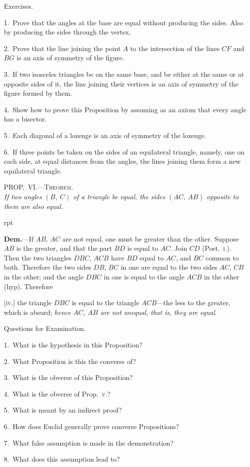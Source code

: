 \documentclass[oneside]{book}
\newcounter{wrapwidth}
\newcommand\myprop[2]{
\bigskip\Needspace*{4\baselineskip}\begin{center}\textsc{#1}\\\medskip\emph{#2}\par\end{center}
}
\newcommand\exhead[1]{
\Needspace*{5\baselineskip}\begin{center}
\textsf{#1}
\end{center}
}
\newcommand\imgflow[3]{
\setcounter{wrapwidth}{#1}

\begin{wrapfigure}[#2]{r}{\value{wrapwidth}pt}
\begin{center}
\vspace{-0.3in}

\end{center}
\end{wrapfigure}
}
\begin{document}
\exhead{Exercises.}

\begin{footnotesize}
1.~Prove that the angles at the base are equal without producing
the sides. Also by producing the sides through the vertex.

2.~Prove that the line joining the point $A$ to the intersection of
the lines $CF$ and $BG$ is an axis of symmetry of the figure.

3.~If two isosceles triangles be on the same base, and be either
at the same or at opposite sides of it, the line joining their vertices
is an axis of symmetry of the figure formed by them.

4.~Show how to prove this Proposition by assuming as an
axiom that every angle has a bisector.

5.~Each diagonal of a lozenge is an axis of symmetry of the
lozenge.

6.~If three points be taken on the sides of an equilateral triangle,
namely, one on each side, at equal distances from the
angles, the lines joining them form a new equilateral triangle.
\par\end{footnotesize}


\myprop{PROP\@.~VI\@.---Theorem.}{If two angles $(B,\ C)$ of a triangle be equal, the sides
$(AC,\ AB)$ opposite to them are also equal.}


\imgflow{79}{8}{f019}

\textbf{Dem.}---If $AB$, $AC$ are not equal, one must be greater
than the other. Suppose $AB$ is the
greater, and that the part $BD$ is equal
to $AC$. Join $CD$ (Post.~\textsc{i.}). Then the
two triangles $DBC$, $ACB$ have $BD$ equal
to $AC$, and $BC$ common to both. Therefore
the two sides $DB$, $BC$ in one are
equal to the two sides $AC$, $CB$ in the
other; and the angle $DBC$ in one is
equal to the angle $ACB$ in the other (hyp). Therefore

[\textsc{iv.}] the triangle $DBC$ is equal to the triangle
$ACB$---the less to the greater, which is absurd; \emph{hence
$AC$, $AB$ are not unequal, that is, they are equal}.


\exhead{Questions for Examination.}

\begin{footnotesize}
1.~What is the hypothesis in this Proposition?

2.~What Proposition is this the converse of?

3.~What is the obverse of this Proposition?

4.~What is the obverse of Prop.~\textsc{v.}?

5.~What is meant by an indirect proof?

6.~How does Euclid generally prove converse Propositions?

7.~What false assumption is made in the demonstration?

8.~What does this assumption lead to?
\par\end{footnotesize}
\end{document}
